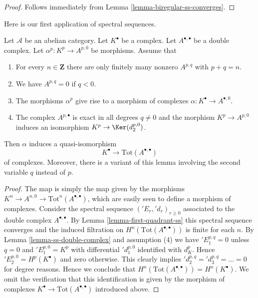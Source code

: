 \begin{proof}
Follows immediately from Lemma \ref{lemma-biregular-ss-converges}.
\end{proof}

\noindent
Here is our first application of spectral sequences.

\begin{lemma}
\label{lemma-double-complex-gives-resolution}
Let $\mathcal{A}$ be an abelian category.
Let $K^\bullet$ be a complex.
Let $A^{\bullet, \bullet}$ be a double complex.
Let $\alpha^p : K^p \to A^{p, 0}$ be morphisms.
Assume that
\begin{enumerate}
\item For every $n \in \mathbf{Z}$ there are only finitely many nonzero
$A^{p, q}$ with $p + q = n$.
\item We have $A^{p, q} = 0$ if $q < 0$.
\item The morphisms $\alpha^p$ give rise to a morphism
of complexes $\alpha : K^\bullet \to A^{\bullet, 0}$.
\item The complex $A^{p, \bullet}$ is exact in all degrees
$q \not = 0$ and the morphism $K^p \to A^{p, 0}$ induces
an isomorphism $K^p \to \Ker(d_2^{p, 0})$.
\end{enumerate}
Then $\alpha$ induces a quasi-isomorphism
$$
K^\bullet \longrightarrow \text{Tot}(A^{\bullet, \bullet})
$$
of complexes.
Moreover, there is a variant of this lemma involving the second
variable $q$ instead of $p$.
\end{lemma}

\begin{proof}
The map is simply the map given by the morphisms
$K^n \to A^{n, 0} \to \text{Tot}^n(A^{\bullet, \bullet})$,
which are easily seen to define a morphism of complexes.
Consider the spectral sequence $({}'E_r, {}'d_r)_{r \geq 0}$
associated to the double complex $A^{\bullet, \bullet}$.
By Lemma \ref{lemma-first-quadrant-ss} this spectral sequence converges
and the induced filtration on $H^n(\text{Tot}(A^{\bullet, \bullet}))$
is finite for each $n$.
By Lemma \ref{lemma-ss-double-complex} and assumption (4) we have
${}'E_1^{p, q} = 0$ unless $q = 0$ and $'E_1^{p, 0} = K^p$
with differential ${}'d_1^{p, 0}$ identified with $d_K^p$.
Hence ${}'E_2^{p, 0} = H^p(K^\bullet)$ and zero otherwise.
This clearly implies ${}'d_2^{p, q} = {}'d_3^{p, q} = \ldots = 0$
for degree reasons. Hence we conclude that
$H^n(\text{Tot}(A^{\bullet, \bullet})) = H^n(K^\bullet)$.
We omit the verification that this identification is given by the
morphism of complexes $K^\bullet \to \text{Tot}(A^{\bullet, \bullet})$
introduced above.
\end{proof}


